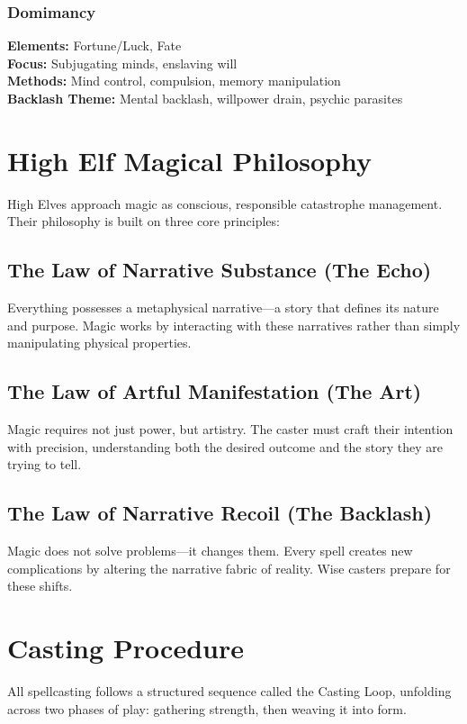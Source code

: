 \documentclass[11pt]{report}
\begin{document}
\subsubsection{Domimancy}
\textbf{Elements:} Fortune/Luck, Fate\\
\textbf{Focus:} Subjugating minds, enslaving will\\
\textbf{Methods:} Mind control, compulsion, memory manipulation\\
\textbf{Backlash Theme:} Mental backlash, willpower drain, psychic parasites

\section{High Elf Magical Philosophy}

High Elves approach magic as conscious, responsible catastrophe management. Their philosophy is built on three core principles:

\subsection{The Law of Narrative Substance (The Echo)}
Everything possesses a metaphysical narrative---a story that defines its nature and purpose. Magic works by interacting with these narratives rather than simply manipulating physical properties.

\subsection{The Law of Artful Manifestation (The Art)}
Magic requires not just power, but artistry. The caster must craft their intention with precision, understanding both the desired outcome and the story they are trying to tell.

\subsection{The Law of Narrative Recoil (The Backlash)}
Magic does not solve problems---it changes them. Every spell creates new complications by altering the narrative fabric of reality. Wise casters prepare for these shifts.

\section{Casting Procedure}

All spellcasting follows a structured sequence called the Casting Loop, unfolding across two phases of play: gathering strength, then weaving it into form.
\end{document}
